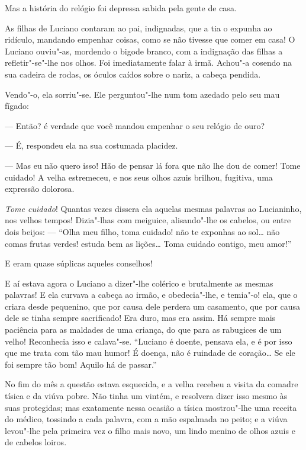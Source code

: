 Mas a história do relógio foi depressa sabida pela gente de casa.

As filhas de Luciano contaram ao pai, indignadas, que a tia o expunha ao
ridículo, mandando empenhar coisas, como se não tivesse que comer em
casa! O Luciano ouviu"-as, mordendo o bigode branco, com a indignação das
filhas a refletir"-se"-lhe nos olhos. Foi imediatamente falar à irmã.
Achou"-a cosendo na sua cadeira de rodas, os óculos caídos sobre o nariz,
a cabeça pendida.

Vendo"-o, ela sorriu"-se. Ele perguntou"-lhe num tom azedado pelo seu mau
fígado:

--- Então? é verdade que você mandou empenhar o seu relógio de ouro?

--- É, respondeu ela na sua costumada placidez.

--- Mas eu não quero isso! Hão de pensar lá fora que não lhe dou de
comer! Tome cuidado! A velha estremeceu, e nos seus olhos azuis brilhou,
fugitiva, uma expressão dolorosa.

\emph{Tome cuidado}! Quantas vezes dissera ela aquelas mesmas palavras
ao Lucianinho, nos velhos tempos! Dizia"-lhas com meiguice, alisando"-lhe
os cabelos, ou entre dois beijos: --- ``Olha meu filho, toma cuidado!
não te exponhas ao sol\ldots{} não comas frutas verdes! estuda bem as
lições\ldots{} Toma cuidado contigo, meu amor!''

E eram quase súplicas aqueles conselhos!

E aí estava agora o Luciano a dizer"-lhe colérico e brutalmente as mesmas
palavras! E ela curvava a cabeça ao irmão, e obedecia"-lhe, e temia"-o!
ela, que o criara desde pequenino, que por causa dele perdera um
casamento, que por causa dele se tinha sempre sacrificado! Era duro, mas
era assim. Há sempre mais paciência para as maldades de uma criança, do
que para as rabugices de um velho! Reconhecia isso e calava"-se.
``Luciano é doente, pensava ela, e é por isso que me trata com tão mau
humor! É doença, não é ruindade de coração\ldots{} Se ele foi sempre tão bom!
Aquilo há de passar.''

No fim do mês a questão estava esquecida, e a velha recebeu a visita da
comadre tísica e da viúva pobre. Não tinha um vintém, e resolvera dizer
isso mesmo às suas protegidas; mas exatamente nessa ocasião a tísica
mostrou"-lhe uma receita do médico, tossindo a cada palavra, com a mão
espalmada no peito; e a viúva levou"-lhe pela primeira vez o filho mais
novo, um lindo menino de olhos azuis e de cabelos loiros.

